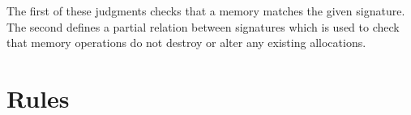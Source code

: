 The first of these judgments checks that a memory matches the given signature. The second defines a partial relation between signatures which is used to check that memory operations do not destroy or alter any existing allocations.

\section{Rules}

\begin{mathpar}




\end{mathpar}

\begin{mathpar}









\end{mathpar}

\begin{mathpar}















\end{mathpar}

